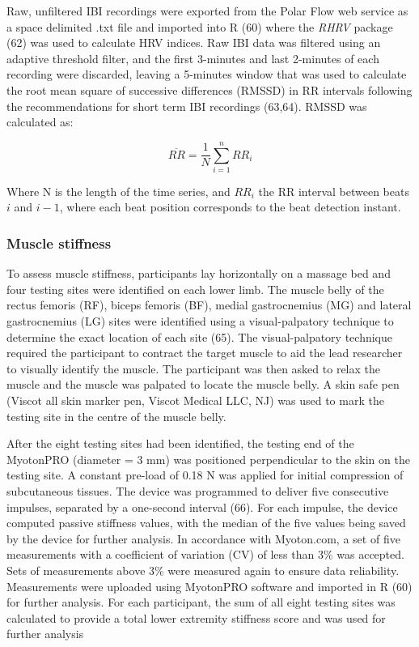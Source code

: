 \documentclass[
  english,
  man]{apa6}
\begin{document}
Raw, unfiltered IBI recordings were exported from the Polar Flow web service as a space delimited .txt file and imported into R (60) where the \emph{RHRV} package (62) was used to calculate HRV indices.
Raw IBI data was filtered using an adaptive threshold filter, and the first 3-minutes and last 2-minutes of each recording were discarded, leaving a 5-minutes window that was used to calculate the root mean square of successive differences (RMSSD) in RR intervals following the recommendations for short term IBI recordings (63,64). RMSSD was calculated as:

\begin{equation} 
  \overline{RR} = \frac{1}{N} \sum_{i=1}^{n} RR_i
\end{equation}

Where N is the length of the time series, and \(RR_i\) the RR interval between beats \(i\) and \(i-1\), where each beat position corresponds to the beat detection instant.

\hypertarget{muscle-stiffness}{%
\subsubsection{Muscle stiffness}\label{muscle-stiffness}}

To assess muscle stiffness, participants lay horizontally on a massage bed and four testing sites were identified on each lower limb.
The muscle belly of the rectus femoris (RF), biceps femoris (BF), medial gastrocnemius (MG) and lateral gastrocnemius (LG) sites were identified using a visual-palpatory technique to determine the exact location of each site (65).
The visual-palpatory technique required the participant to contract the target muscle to aid the lead researcher to visually identify the muscle.
The participant was then asked to relax the muscle and the muscle was palpated to locate the muscle belly. A skin safe pen (Viscot all skin marker pen, Viscot Medical LLC, NJ) was used to mark the testing site in the centre of the muscle belly.

After the eight testing sites had been identified, the testing end of the MyotonPRO (diameter = 3 mm) was positioned perpendicular to the skin on the testing site.
A constant pre-load of 0.18 N was applied for initial compression of subcutaneous tissues.
The device was programmed to deliver five consecutive impulses, separated by a one-second interval (66).
For each impulse, the device computed passive stiffness values, with the median of the five values being saved by the device for further analysis. In accordance with Myoton.com, a set of five measurements with a coefficient of variation (CV) of less than 3\% was accepted. Sets of measurements above 3\% were measured again to ensure data reliability.
Measurements were uploaded using MyotonPRO software and imported in R (60) for further analysis. For each participant, the sum of all eight testing sites was calculated to provide a total lower extremity stiffness score and was used for further analysis
\end{document}
